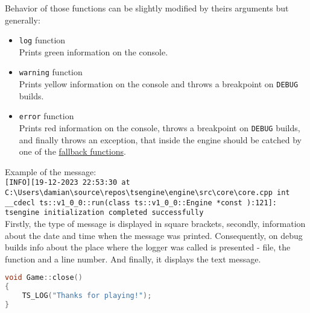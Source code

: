 \newpage
Behavior of those functions can be slightly modified by theirs arguments but generally:
\begin{itemize}
    \item \texttt{log} function\\
    Prints green information on the console.
    \item \texttt{warning} function\\ 
    Prints yellow information on the console and throws a breakpoint on \texttt{DEBUG} builds.
    \item \texttt{error} function\\
    Prints red information on the console, throws a breakpoint on \texttt{DEBUG} builds, and finally throws an exception, that inside the engine should be catched by one of the \hyperref[sec:fallbacks]{fallback functions}.
\end{itemize}

Example of the message:\\
\texttt{[INFO][19-12-2023 22:53:30 at C:\textbackslash Users\textbackslash damian\textbackslash source\textbackslash repos\textbackslash tsengine\textbackslash engine\textbackslash src\textbackslash core\textbackslash core.cpp int \_\_cdecl ts::v1\_0\_0::run(class ts::v1\_0\_0::Engine *const ):121]: tsengine initialization completed successfully}\\

Firstly, the type of message is displayed in square brackets, secondly, information about the date and time when the message was printed. Consequently, on debug builds info about the place where the logger was called is presented - file, the function and a line number. And finally, it displays the text message. 

\begin{lstlisting}[language=c++, caption=An example of the logger message (./engine/include/tsengine/logger.h)]
void Game::close()
{
    TS_LOG("Thanks for playing!");
}
\end{lstlisting}